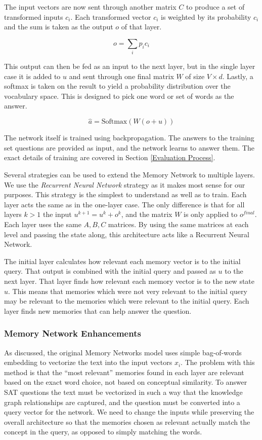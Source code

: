 \documentclass[pageno]{final_paper}
\begin{document}
The input vectors are now sent through another matrix $C$ to produce a set of
transformed inputs ${c_i}$. Each transformed vector $c_i$ is weighted by its
probability $c_i$ and the sum is taken as the output $o$ of that layer.

$$o = \sum_i p_i c_i$$

This output can then be fed as an input to the next layer, but in the single
layer case it is added to $u$ and sent through one final matrix $W$ of size
$V\times d$. Lastly, a softmax is taken on the result to yield a probability
distribution over the vocabulary space. This is designed to pick one word
or set of words as the answer.

$$\hat{a} = \text{Softmax}\left(W\left(o + u\right)\right)$$

The network itself is trained using backpropagation. The answers to the training
set questions are provided as input, and the network learns to answer them. The
exact details of training are covered in Section \ref{Evaluation Process}.

Several strategies can be used to extend the Memory Network to multiple layers.
We use the \textit{Recurrent Neural Network} strategy as it makes most sense for
our purposes. This strategy is the simplest to understand as well as to train.
Each layer acts the same as in the one-layer case. The only difference is that
for all layers $k > 1$ the input $u^{k+1} = u^k + o^k$, and the matrix $W$ is
only applied to $o^{final}$. Each layer uses the same $A,B,C$ matrices. By using
the same matrices at each level and passing the state along, this architecture
acts like a Recurrent Neural Network.

The initial layer calculates how relevant each memory vector is to the initial
query. That output is combined with the initial query and passed as $u$ to the
next layer. That layer finds how relevant each memory vector is to the new state
$u$. This means that memories which were not very relevant to the initial query
may be relevant to the memories which were relevant to the initial query. Each
layer finds new memories that can help answer the question. \\

\subsubsection{Memory Network Enhancements}
\label{Memory Network Enhancements}

As discussed, the original Memory Networks model uses simple bag-of-words
embedding to vectorize the text into the input vectors ${x_i}$. The problem with
this method is that the ``most relevant'' memories found in each layer are
relevant based on the exact word choice, not based on conceptual similarity. To
answer SAT questions the text must be vectorized in such a way that the
knowledge graph relationships are captured, and the question must be converted
into a query vector for the network. We need to change the inputs while
preserving the overall architecture so that the memories chosen as relevant
actually match the concept in the query, as opposed to simply matching the
words.
\end{document}
